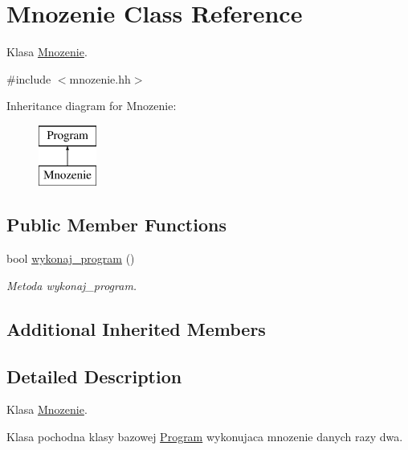 \hypertarget{class_mnozenie}{\section{Mnozenie Class Reference}
\label{class_mnozenie}
}


Klasa \hyperlink{class_mnozenie}{Mnozenie}.  




{\ttfamily \#include $<$mnozenie.\-hh$>$}

Inheritance diagram for Mnozenie\-:\begin{figure}[H]
\begin{center}
\leavevmode
\includegraphics[height=2.000000cm]{class_mnozenie}
\end{center}
\end{figure}
\subsection*{Public Member Functions}
\begin{DoxyCompactItemize}
\item 
bool \hyperlink{class_mnozenie_a540045a41aef8f58ecbf6c9afe606d85}{wykonaj\-\_\-program} ()
\begin{DoxyCompactList}\small\item\em Metoda wykonaj\-\_\-program. \end{DoxyCompactList}\end{DoxyCompactItemize}
\subsection*{Additional Inherited Members}


\subsection{Detailed Description}
Klasa \hyperlink{class_mnozenie}{Mnozenie}. 

Klasa pochodna klasy bazowej \hyperlink{class_program}{Program} wykonujaca mnozenie danych razy dwa. 

